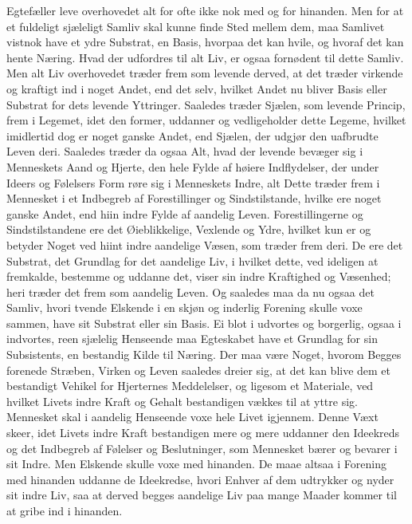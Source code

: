 \documentclass[12pt,a4paper]{book}
\newcommand{\apage}[1]{\marginnote{\footnotesize\textit{[#1]}}}
\begin{document}
Egtefæller leve overhovedet alt for ofte ikke nok med og for hinanden.
Men for at et fuldeligt sjæleligt Samliv skal kunne finde Sted mellem
dem, maa Samlivet vistnok have et ydre Substrat, en Basis, hvorpaa det
kan hvile, og hvoraf det kan hente Næring. Hvad der udfordres til alt
Liv, er ogsaa fornødent til dette Samliv. Men alt Liv overhovedet træder
frem som levende derved, at det træder virkende og kraftigt ind i noget
Andet, end det selv, hvilket Andet nu bliver Basis eller Substrat for
dets levende Yttringer. Saaledes træder Sjælen, som levende Princip,
frem i Legemet, idet den former, uddanner og vedligeholder dette Legeme,
hvilket imidlertid dog er noget ganske Andet, end Sjælen, der udgjør den
uafbrudte Leven deri. Saaledes træder da ogsaa Alt, hvad der levende
bevæger sig i Menneskets Aand og Hjerte, den hele Fylde af høiere
Indflydelser, der under Ideers og Følelsers Form røre sig i Menneskets
Indre, alt Dette træder frem i Mennesket i et Indbegreb af Forestillinger \apage{102}
og Sindstilstande, hvilke ere noget ganske Andet, end hiin indre Fylde
af aandelig Leven. Forestillingerne og Sindstilstandene ere det
Øieblikkelige, Vexlende og Ydre, hvilket kun er og betyder Noget ved
hiint indre aandelige Væsen, som træder frem deri. De ere det Substrat,
det Grundlag for det aandelige Liv, i hvilket dette, ved ideligen at
fremkalde, bestemme og uddanne det, viser sin indre Kraftighed og
Væsenhed; heri træder det frem som aandelig Leven. Og saaledes maa da nu
ogsaa det Samliv, hvori tvende Elskende i en skjøn og inderlig Forening
skulle voxe sammen, have sit Substrat eller sin Basis. Ei blot i
udvortes og borgerlig, ogsaa i indvortes, reen sjælelig Henseende maa
Egteskabet have et Grundlag for sin Subsistents, en bestandig Kilde til
Næring. Der maa være Noget, hvorom Begges forenede Stræben, Virken og
Leven saaledes dreier sig, at det kan blive dem et bestandigt Vehikel for
Hjerternes Meddelelser, og ligesom et Materiale, ved hvilket Livets indre
Kraft og Gehalt bestandigen vækkes til at yttre sig. Mennesket skal i
aandelig Henseende voxe hele Livet igjennem. Denne Væxt skeer, idet
Livets indre Kraft bestandigen mere og mere uddanner den Ideekreds og det
Indbegreb af Følelser og Beslutninger, som Mennesket bærer og bevarer i
sit Indre. Men Elskende skulle voxe med hinanden. De maae altsaa i
Forening med hinanden uddanne de Ideekredse, hvori Enhver af dem
udtrykker og nyder sit indre Liv, saa at derved begges aandelige \apage{103} Liv paa
mange Maader kommer til at gribe ind i hinanden.
\end{document}
